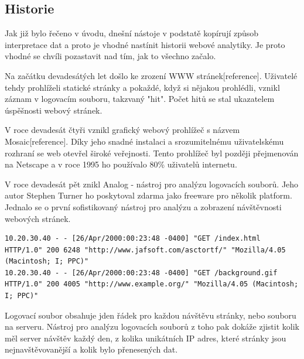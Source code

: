 \documentclass[bc,female,java,dept456]{diploma}						%
\begin{document}
\subsection{Historie}

Jak již bylo řečeno v úvodu, dnešní nástoje v podstatě kopírují způsob interpretace dat a proto je vhodné nastínit historii webové analytiky. Je proto vhodné se chvíli pozastavit nad tím, jak to všechno začalo.

Na začátku devadesátých let došlo ke zrození WWW stránek[reference]. Uživatelé tehdy prohlíželi statické stránky a pokaždé, když si nějakou prohlédli, vznikl záznam v logovacím souboru, takzvaný "hit". Počet hitů se stal ukazatelem úspěšnosti webový stránek.

V roce devadesát čtyři vznikl grafický webový prohlížeč s názvem Mosaic[reference]. Díky jeho snadné instalaci a srozumitelnému uživatelskému rozhraní se web otevřel široké veřejnosti. Tento prohlížeč byl později přejmenován na Netscape a v roce 1995 ho používalo 80\% uživatelů internetu.

V roce devadesát pět znikl Analog - nástroj pro analýzu logovacích souborů. Jeho autor Stephen Turner ho poskytoval zdarma jako freeware pro několik platform. Jednalo se o první sofistikovaný nástroj pro analýzu a zobrazení návštěvnosti webových stránek.

\bigskip

\begin{lstlisting}[label=src:Plain,caption=Ukázka záznamu z logovacího souboru ve formátu RFC931]
10.20.30.40 - - [26/Apr/2000:00:23:48 -0400] "GET /index.html HTTP/1.0" 200 6248 "http://www.jafsoft.com/asctortf/" "Mozilla/4.05 (Macintosh; I; PPC)"
10.20.30.40 - - [26/Apr/2000:00:23:48 -0400] "GET /background.gif HTTP/1.0" 200 4005 "http://www.example.org/" "Mozilla/4.05 (Macintosh; I; PPC)"
\end{lstlisting}

\bigskip

Logovací soubor obsahuje jden řádek pro každou návštěvu stránky, nebo souboru na serveru. Nástroj pro analýzu logovacích souborů z toho pak dokáže zjistit kolik měl server návštěv každý den, z kolika unikátních IP adres, které stránky jsou nejnavštěvovanější a kolik bylo přenesených dat.

\end{document}
